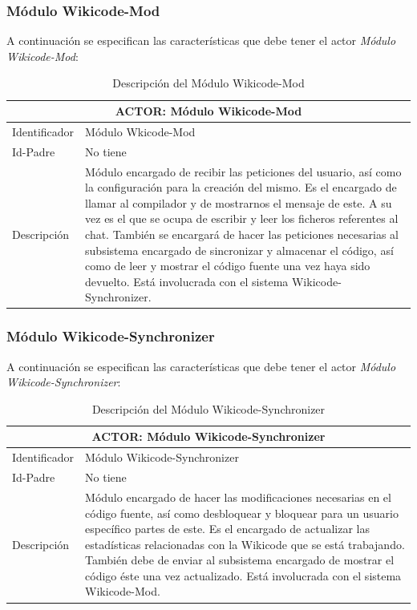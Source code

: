 \newpage

\subsubsection{Módulo Wikicode-Mod}

A continuación se especifican las características que debe tener el actor \emph{Módulo Wikicode-Mod}:

\begin{table}[h]
\centering
\begin{tabular}{ | p{} | p{} | }
	\hline
	\multicolumn{2}{|c|}{ACTOR: Módulo Wikicode-Mod} \\
	\hline
	Identificador  & Módulo Wkicode-Mod \\
	\hline 
	Id-Padre & No tiene \\
	\hline
	Descripción & Módulo encargado de recibir las peticiones del usuario, así como la configuración para la creación del mismo. Es el encargado de llamar al compilador y de mostrarnos el mensaje de este. A su vez es el que se ocupa de escribir y leer los ficheros referentes al chat. También se encargará de hacer las peticiones necesarias al subsistema encargado de sincronizar y almacenar el código, así como de leer y mostrar el código fuente una vez haya sido devuelto. Está involucrada con el sistema Wikicode-Synchronizer.\\
	\hline
\end{tabular}
\caption{Descripción del Módulo Wikicode-Mod}
\end{table}

\subsubsection{Módulo Wikicode-Synchronizer}

A continuación se especifican las características que debe tener el actor \emph{Módulo Wikicode-Synchronizer}:

\begin{table}[h]
\centering
\begin{tabular}{ | p{} | p{} | }
	\hline
	\multicolumn{2}{|c|}{ACTOR: Módulo Wikicode-Synchronizer} \\
	\hline
	Identificador  & Módulo Wikicode-Synchronizer \\
	\hline 
	Id-Padre & No tiene \\
	\hline
	Descripción & Módulo encargado de hacer las modificaciones necesarias en el código fuente, así como desbloquear y bloquear para un usuario específico partes de este. Es el encargado de actualizar las estadísticas relacionadas con la Wikicode que se está trabajando. También debe de enviar al subsistema encargado de mostrar el código éste una vez actualizado. Está involucrada con el sistema Wikicode-Mod.\\
	\hline
\end{tabular}
\caption{Descripción del Módulo Wikicode-Synchronizer}
\end{table}

